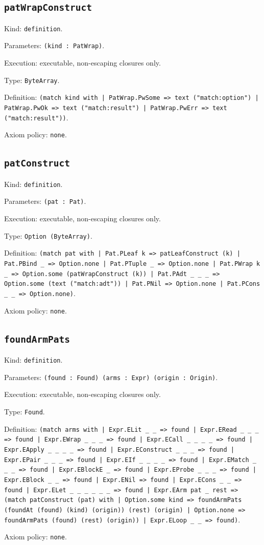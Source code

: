 \documentclass[11pt]{article}
\begin{document}
\subsection*{\texttt{patWrapConstruct}}
\noindent Kind: \texttt{definition}.\par
\noindent Parameters: \texttt{(kind : PatWrap)}.\par
\noindent Execution: executable, non-escaping closures only.\par
\noindent Type: \texttt{ByteArray}.\par
\noindent Definition: \texttt{(match kind with | PatWrap.PwSome => text ("match:option") | PatWrap.PwOk => text ("match:result") | PatWrap.PwErr => text ("match:result"))}.\par
\noindent Axiom policy: \texttt{none}.\par
\subsection*{\texttt{patConstruct}}
\noindent Kind: \texttt{definition}.\par
\noindent Parameters: \texttt{(pat : Pat)}.\par
\noindent Execution: executable, non-escaping closures only.\par
\noindent Type: \texttt{Option (ByteArray)}.\par
\noindent Definition: \texttt{(match pat with | Pat.PLeaf k => patLeafConstruct (k) | Pat.PBind \_ => Option.none | Pat.PTuple \_ => Option.none | Pat.PWrap k \_ => Option.some (patWrapConstruct (k)) | Pat.PAdt \_ \_ \_ => Option.some (text ("match:adt")) | Pat.PNil => Option.none | Pat.PCons \_ \_ => Option.none)}.\par
\noindent Axiom policy: \texttt{none}.\par
\subsection*{\texttt{foundArmPats}}
\noindent Kind: \texttt{definition}.\par
\noindent Parameters: \texttt{(found : Found) (arms : Expr) (origin : Origin)}.\par
\noindent Execution: executable, non-escaping closures only.\par
\noindent Type: \texttt{Found}.\par
\noindent Definition: \texttt{(match arms with | Expr.ELit \_ \_ => found | Expr.ERead \_ \_ \_ => found | Expr.EWrap \_ \_ \_ => found | Expr.ECall \_ \_ \_ \_ => found | Expr.EApply \_ \_ \_ \_ => found | Expr.EConstruct \_ \_ \_ => found | Expr.EPair \_ \_ \_ => found | Expr.EIf \_ \_ \_ \_ => found | Expr.EMatch \_ \_ \_ => found | Expr.EBlockE \_ => found | Expr.EProbe \_ \_ \_ => found | Expr.EBlock \_ \_ => found | Expr.ENil => found | Expr.ECons \_ \_ => found | Expr.ELet \_ \_ \_ \_ \_ \_ => found | Expr.EArm pat \_ rest => (match patConstruct (pat) with | Option.some kind => foundArmPats (foundAt (found) (kind) (origin)) (rest) (origin) | Option.none => foundArmPats (found) (rest) (origin)) | Expr.ELoop \_ \_ => found)}.\par
\noindent Axiom policy: \texttt{none}.\par
\end{document}

